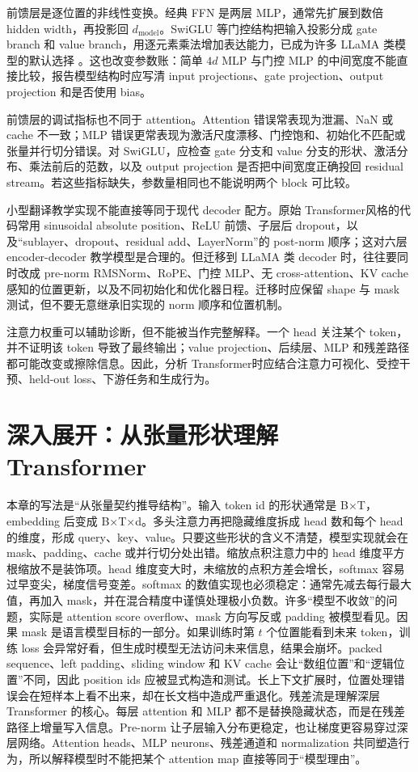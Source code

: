\documentclass[UTF8,zihao=-4,openany]{ctexbook}
\newcommand{\Transformer}{Transformer}
\begin{document}
前馈层是逐位置的非线性变换。经典 FFN 是两层 MLP，通常先扩展到数倍 hidden width，再投影回 $d_{\mathrm{model}}$。SwiGLU 等门控结构把输入投影分成 gate branch 和 value branch，用逐元素乘法增加表达能力，已成为许多 LLaMA 类模型的默认选择 \cite{shazeer2020glu}。这也改变参数账：简单 $4d$ MLP 与门控 MLP 的中间宽度不能直接比较，报告模型结构时应写清 input projections、gate projection、output projection 和是否使用 bias。

前馈层的调试指标也不同于 attention。Attention 错误常表现为泄漏、NaN 或 cache 不一致；MLP 错误更常表现为激活尺度漂移、门控饱和、初始化不匹配或张量并行切分错误。对 SwiGLU，应检查 gate 分支和 value 分支的形状、激活分布、乘法前后的范数，以及 output projection 是否把中间宽度正确投回 residual stream。若这些指标缺失，参数量相同也不能说明两个 block 可比较。

小型翻译教学实现不能直接等同于现代 decoder 配方。原始 \Transformer 风格的代码常用 sinusoidal absolute position、ReLU 前馈、子层后 dropout，以及“sublayer、dropout、residual add、LayerNorm”的 post-norm 顺序；这对六层 encoder-decoder 教学模型是合理的。但迁移到 LLaMA 类 decoder 时，往往要同时改成 pre-norm RMSNorm、RoPE、门控 MLP、无 cross-attention、KV cache 感知的位置更新，以及不同初始化和优化器日程。迁移时应保留 shape 与 mask 测试，但不要无意继承旧实现的 norm 顺序和位置机制。

注意力权重可以辅助诊断，但不能被当作完整解释。一个 head 关注某个 token，并不证明该 token 导致了最终输出；value projection、后续层、MLP 和残差路径都可能改变或擦除信息。因此，分析 \Transformer 时应结合注意力可视化、受控干预、held-out loss、下游任务和生成行为。

\section{深入展开：从张量形状理解 Transformer}
本章的写法是“从张量契约推导结构”。输入 token id 的形状通常是 B×T，embedding 后变成 B×T×d。多头注意力再把隐藏维度拆成 head 数和每个 head 的维度，形成 query、key、value。只要这些形状的含义不清楚，模型实现就会在 mask、padding、cache 或并行切分处出错。缩放点积注意力中的 head 维度平方根缩放不是装饰项。head 维度变大时，未缩放的点积方差会增长，softmax 容易过早变尖，梯度信号变差。softmax 的数值实现也必须稳定：通常先减去每行最大值，再加入 mask，并在混合精度中谨慎处理极小负数。许多“模型不收敛”的问题，实际是 attention score overflow、mask 方向写反或 padding 被模型看见。因果 mask 是语言模型目标的一部分。如果训练时第 $t$ 个位置能看到未来 token，训练 loss 会异常好看，但生成时模型无法访问未来信息，结果会崩坏。packed sequence、left padding、sliding window 和 KV cache 会让“数组位置”和“逻辑位置”不同，因此 position ids 应被显式构造和测试。长上下文扩展时，位置处理错误会在短样本上看不出来，却在长文档中造成严重退化。残差流是理解深层 Transformer 的核心。每层 attention 和 MLP 都不是替换隐藏状态，而是在残差路径上增量写入信息。Pre-norm 让子层输入分布更稳定，也让梯度更容易穿过深层网络。Attention heads、MLP neurons、残差通道和 normalization 共同塑造行为，所以解释模型时不能把某个 attention map 直接等同于“模型理由”。
\end{document}
